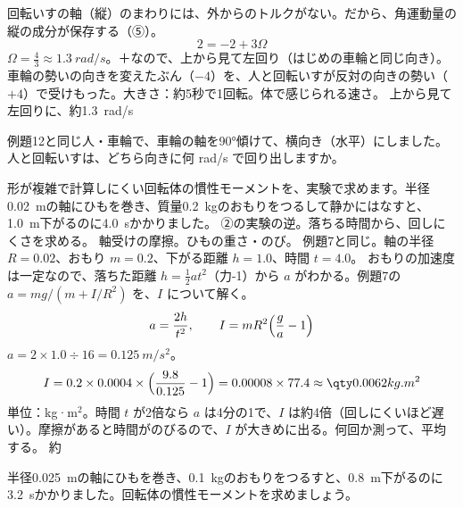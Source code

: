 \begin{phreidai}
\begin{bkcenter}
\label{ph:力-6:fig-wheel}
\end{bkcenter}
\phriyu
回転いすの軸（縦）のまわりには、外からのトルクがない。だから、角運動量の縦の成分が保存する（⑤）。
\phtateru
\[ 2=-2+3\Omega \]
\phtoku
$\Omega=\tfrac{4}{3}\approx\qty{1.3}{rad/s}$。＋なので、上から見て左回り（はじめの車輪と同じ向き）。
\phtashikame
車輪の勢いの向きを変えたぶん（$-4$）を、人と回転いすが反対の向きの勢い（$+4$）で受けもった。\quad 大きさ：約5秒で1回転。体で感じられる速さ。
\kotae 上から見て左回りに、約\qty{1.3}{rad/s}
\end{phreidai}
\begin{jibun}
例題12と同じ人・車輪で、車輪の軸を90°傾けて、横向き（水平）にしました。人と回転いすは、どちら向きに何 rad/s で回り出しますか。
\end{jibun}

\begin{phreidai}[慣性モーメントを実験で求める]
\label{ph:力-6:ex13}形が複雑で計算しにくい回転体の慣性モーメントを、実験で求めます。半径\qty{0.02}{m}の軸にひもを巻き、質量\qty{0.2}{kg}のおもりをつるして静かにはなすと、\qty{1.0}{m}下がるのに\qty{4.0}{s}かかりました。
\phbamen
②の実験の逆。落ちる時間から、回しにくさを求める。
\phmushi
軸受けの摩擦。ひもの重さ・のび。
\phzu
例題7と同じ。軸の半径 $R=0.02$、おもり $m=0.2$、下がる距離 $h=1.0$、時間 $t=4.0$。
\phriyu
おもりの加速度は一定なので、落ちた距離 $h=\tfrac{1}{2}at^2$（力-1）から $a$ がわかる。例題7の $a=mg/(m+I/R^2)$ を、$I$ について解く。
\phtateru
\[ a=\frac{2h}{t^2},\qquad I=mR^2\Bigl(\frac{g}{a}-1\Bigr) \]
\phtoku
$a=2\times1.0\div16=\qty{0.125}{m/s^2}$。
\[ I=0.2\times0.0004\times\Bigl(\frac{9.8}{0.125}-1\Bigr)=0.00008\times77.4\approx\pxgI{0.0062} \]
\phtashikame
単位：kg·m$^2$。\quad 時間 $t$ が2倍なら $a$ は4分の1で、$I$ は約4倍（回しにくいほど遅い）。\quad 摩擦があると時間がのびるので、$I$ が大きめに出る。何回か測って、平均する。
\kotae 約
\end{phreidai}
\begin{jibun}
半径\qty{0.025}{m}の軸にひもを巻き、\qty{0.1}{kg}のおもりをつるすと、\qty{0.8}{m}下がるのに\qty{3.2}{s}かかりました。回転体の慣性モーメントを求めましょう。
\end{jibun}

